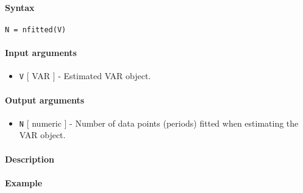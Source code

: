 


	\paragraph{Syntax}

\begin{verbatim}
N = nfitted(V)
\end{verbatim}

\paragraph{Input arguments}

\begin{itemize}
\itemsep1pt\parskip0pt
\item
  \texttt{V} {[} VAR {]} - Estimated VAR object.
\end{itemize}

\paragraph{Output arguments}

\begin{itemize}
\itemsep1pt\parskip0pt
\item
  \texttt{N} {[} numeric {]} - Number of data points (periods) fitted
  when estimating the VAR object.
\end{itemize}

\paragraph{Description}

\paragraph{Example}



